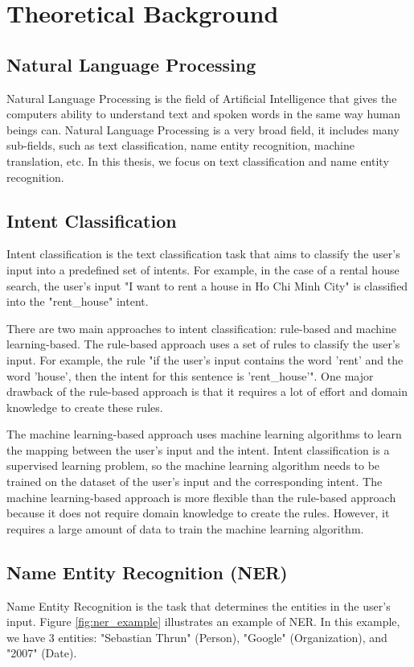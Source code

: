 \chapter{Theoretical Background}
\label{chap:theoretical-background}

\section{Natural Language Processing}
Natural Language Processing is the field of Artificial Intelligence that gives the computers ability to understand text and spoken words in the same way human beings can. Natural Language Processing is a very broad field, it includes many sub-fields, such as text classification, name entity recognition, machine translation, etc. In this thesis, we focus on text classification and name entity recognition.

\section{Intent Classification}

Intent classification is the text classification task that aims to classify the user's input into a predefined set of intents. For example, in the case of a rental house search, the user's input "I want to rent a house in Ho Chi Minh City" is classified into the "rent\_house" intent.

There are two main approaches to intent classification: rule-based and machine learning-based. The rule-based approach uses a set of rules to classify the user's input. For example, the rule "if the user's input contains the word 'rent' and the word 'house', then the intent for this sentence is 'rent\_house'". One major drawback of the rule-based approach is that it requires a lot of effort and domain knowledge to create these rules.


The machine learning-based approach uses machine learning algorithms to learn the mapping between the user's input and the intent. Intent classification is a supervised learning problem, so the machine learning algorithm needs to be trained on the dataset of the user's input and the corresponding intent. The machine learning-based approach is more flexible than the rule-based approach because it does not require domain knowledge to create the rules. However, it requires a large amount of data to train the machine learning algorithm.

\section{Name Entity Recognition (NER)}
Name Entity Recognition is the task that determines the entities in the user's input. Figure \ref{fig:ner_example} illustrates an example of NER. In this example, we have 3 entities: "Sebastian Thrun" (Person), "Google" (Organization), and "2007" (Date).


